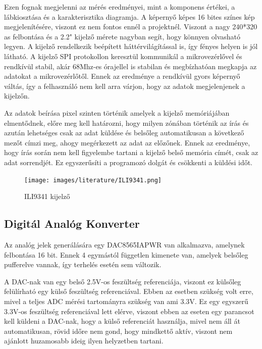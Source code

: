 Ezen fognak megjelenni az mérés eredményei, mint a komponens értékei, a lábkiosztása
és a karakterisztika diagramja. A képernyő képes 16 bites színes kép megjelenítésére,
viszont ez nem fontos ennél a projektnél. Viszont a nagy 240*320 as felbontása és
a 2.2" kijelző mérete nagyban segít, hogy könnyen olvasható legyen. A kijelző rendelkezik
beépített háttérvilágítással is, így fényes helyen is jól látható.
A kijelző SPI protokollon keresztül kommunikál a mikrovezérlővel és rendkívül stabil,
akár 68Mhz-es órajellel is stabilan és megbízhatóan megkapja az adatokat a mikrovezérlőtől.
Ennek az eredménye a rendkívül gyors képernyő váltás, így a felhasználó nem kell
arra várjon, hogy az adatok megjelenjenek a kijelzőn.

Az adatok beírása pixel szinten történik amelyek a kijelző memóriájában elmentődnek, 
előre meg kell határozni, hogy milyen
zónában történik az írás és azután lehetséges csak az adat küldése és belsőleg automatikusan
a következő mezőt címzi meg, ahogy megérkezett az adat az előzőnek. Ennek az eredménye,
hogy írás során nem kell figyelembe tartani a kijelző belső memória címét, csak az 
adat sorrendjét. Ez egyszerűsíti a programozó dolgát és csökkenti a küldési
időt.

\begin{figure}[H]
    \centering
    \texttt{[image: images/literature/ILI9341.png]}
    \caption{ILI9341 kijelző}
    \label{fig:ILI9341 kijelző}
\end{figure}

\subsection{Digitál Analóg Konverter}

Az analóg jelek generálására egy DAC8565IAPWR \cite{DAC} van alkalmazva, 
amelynek felbontása 16 bit.
Ennek 4 egymástól független kimenete van, amelyek belsőleg pufferelve vannak,
így terhelés esetén sem változik. 

A DAC-nak van egy belső 2.5V-os feszültség referenciája,
viszont ez külsőleg felülírható egy külső feszültség referenciával. Ebben az 
esetben szükség volt erre, mivel a teljes ADC mérési tartományra szükség van
ami 3.3V. Ez egy egyszerű 3.3V-os feszültség referenciával lett elérve, viszont
ebben az eseten egy parancsot kell küldeni a DAC-nak, hogy a külső referenciát használja,
mivel nem áll át automatikusan, rövid időre nem gond, hogy mindkettő aktív, viszont
nem ajánlott huzamosabb ideig ilyen helyzetben tartani.

